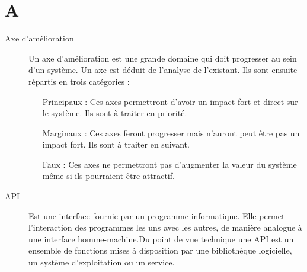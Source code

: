 \section{A}

\begin{description}

\item[Axe d'amélioration] Un axe d'amélioration est une grande domaine qui doit progresser au sein d'un système. Un axe est déduit de l'analyse de
 l'existant. Ils sont ensuite répartis en trois catégories : 

\begin{itemize}
\item[Principaux] : Ces axes permettront d'avoir un impact fort et direct sur le système. Ils sont à traiter en priorité.
\item[Marginaux] : Ces axes feront progresser mais n'auront peut être pas un impact fort. Ils sont à traiter en suivant.
\item[Faux] : Ces axes ne permettront pas d'augmenter la valeur du système même si ils pourraient être attractif.
\end{itemize} 

\item[API] 
Est une interface fournie par un programme informatique. Elle permet l'interaction des programmes les uns avec les autres, de manière analogue à une interface homme-machine.Du point de vue technique une API est un ensemble de fonctions mises à disposition par une bibliothèque logicielle, un système d'exploitation ou un service.

\end{description}
